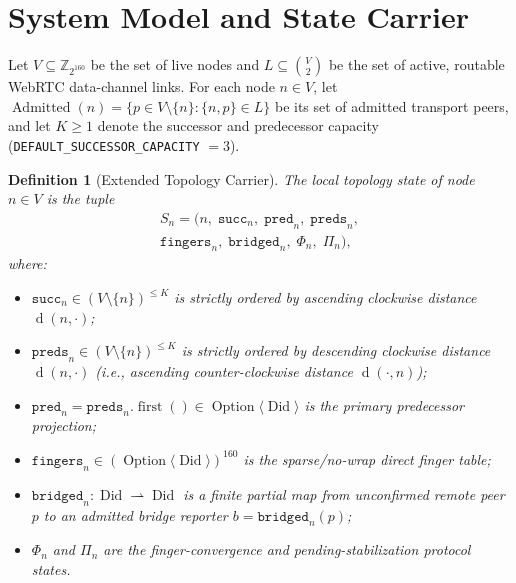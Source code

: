 \documentclass[journal]{IEEEtran}
\newtheorem{definition}{Definition}
\newcommand{\Ring}{\mathbb{Z}_{2^{160}}}
\newcommand{\dist}{\operatorname{d}}
\newcommand{\Admitted}{\operatorname{Admitted}}
\begin{document}
\section{System Model and State Carrier}

Let $V \subseteq \Ring$ be the set of live nodes and $L \subseteq \binom{V}{2}$
be the set of active, routable WebRTC data-channel links. For each node
$n \in V$, let $\Admitted(n) = \{p \in V \setminus \{n\} : \{n, p\} \in L\}$ be
its set of admitted transport peers, and let $K \ge 1$ denote the successor and
predecessor capacity (\texttt{DEFAULT\_SUCCESSOR\_CAPACITY} $= 3$).

\begin{definition}[Extended Topology Carrier]
The local topology state of node $n \in V$ is the tuple
\begin{multline}
  S_n = \bigl(n,\; \texttt{succ}_n,\; \texttt{pred}_n,\; \texttt{preds}_n,\\
  \texttt{fingers}_n,\; \texttt{bridged}_n,\; \Phi_n,\; \Pi_n\bigr),
\end{multline}
where:
\begin{itemize}
  \item $\texttt{succ}_n \in (V \setminus \{n\})^{\le K}$ is strictly ordered by
  ascending clockwise distance $\dist(n, \cdot)$;
  \item $\texttt{preds}_n \in (V \setminus \{n\})^{\le K}$ is strictly ordered
  by \emph{descending} clockwise distance $\dist(n, \cdot)$ (i.e., ascending
  counter-clockwise distance $\dist(\cdot, n)$);
  \item $\texttt{pred}_n = \texttt{preds}_n.\operatorname{first}() \in
  \operatorname{Option}\langle\operatorname{Did}\rangle$ is the primary
  predecessor projection;
  \item $\texttt{fingers}_n \in (\operatorname{Option}\langle\operatorname{Did}\rangle)^{160}$
  is the sparse/no-wrap direct finger table;
  \item $\texttt{bridged}_n : \operatorname{Did} \rightharpoonup \operatorname{Did}$
  is a finite partial map from unconfirmed remote peer $p$ to an admitted bridge
  reporter $b = \texttt{bridged}_n(p)$;
  \item $\Phi_n$ and $\Pi_n$ are the finger-convergence and pending-stabilization
  protocol states.
\end{itemize}
\end{definition}
\end{document}
